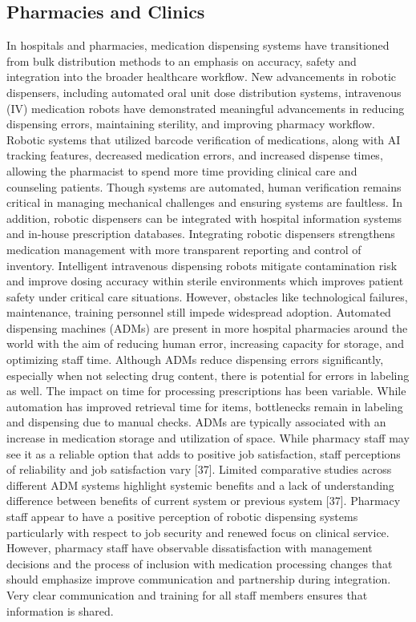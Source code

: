 \subsection{ Pharmacies and Clinics}

In hospitals and pharmacies, medication dispensing systems have transitioned from bulk distribution methods to an emphasis on accuracy, safety and integration into the broader healthcare workflow. New advancements in robotic dispensers, including automated oral unit dose distribution systems, intravenous (IV) medication robots have demonstrated meaningful advancements in reducing dispensing errors, maintaining sterility, and improving pharmacy workflow. Robotic systems that utilized barcode verification of medications, along with AI tracking features, decreased medication errors, and increased dispense times, allowing the pharmacist to spend more time providing clinical care and counseling patients. Though systems are automated, human verification remains critical in managing mechanical challenges and ensuring systems are faultless. 
In addition, robotic dispensers can be integrated with hospital information systems and in-house prescription databases. Integrating robotic dispensers strengthens medication management with more transparent reporting and control of inventory. Intelligent intravenous dispensing robots mitigate contamination risk and improve dosing accuracy within sterile environments which improves patient safety under critical care situations. However, obstacles like technological failures, maintenance, training personnel still impede widespread adoption.
Automated dispensing machines (ADMs) are present in more hospital pharmacies around the world with the aim of reducing human error, increasing capacity for storage, and optimizing staff time. Although ADMs reduce dispensing errors significantly, especially when not selecting drug content, there is potential for errors in labeling as well. The impact on time for processing prescriptions has been variable. While automation has improved retrieval time for items, bottlenecks remain in labeling and dispensing due to manual checks. ADMs are typically associated with an increase in medication storage and utilization of space. While pharmacy staff may see it as a reliable option that adds to positive job satisfaction, staff perceptions of reliability and job satisfaction vary [37]. 
Limited comparative studies across different ADM systems highlight systemic benefits and a lack of understanding difference between benefits of current system or previous system [37].
Pharmacy staff appear to have a positive perception of robotic dispensing systems particularly with respect to job security and renewed focus on clinical service. However, pharmacy staff have observable dissatisfaction with management decisions and the process of inclusion with medication processing changes that should emphasize improve communication and partnership during integration. Very clear communication and training for all staff members ensures that information is shared.


